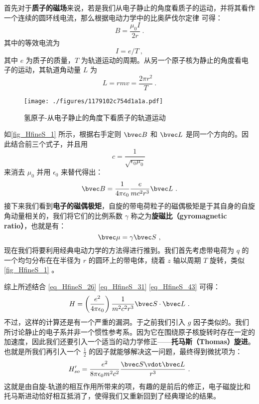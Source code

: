 首先对于\textbf{质子的磁场}来说，若是我们从电子静止的角度看质子的运动，并将其看作一个连续的圆环线电流，那么根据电动力学中的比奥萨伐尔定律 可得：
\begin{equation}
B=\frac{\mu_0I}{2r}~.
\end{equation}
其中的等效电流为
\begin{equation}
I=e/T~,
\end{equation}
其中 $e$ 为质子的质量，$T$ 为轨道运动的周期。从另一个原子核为静止的角度看电子的运动，其轨道角动量 $L$ 为
\begin{equation}
L=rmv=\frac{2\pi r^2}{T}~.
\end{equation}
\begin{figure}[ht]
\centering
\texttt{[image: ./figures/1179102c754d1a1a.pdf]}
\caption{氢原子-从电子静止的角度下看质子的轨道运动} \label{fig_HfineS_1}
\end{figure}
如\autoref{fig_HfineS_1} 所示，根据右手定则 $\bvec B$ 和 $\bvec L$ 是同一个方向的。因此结合前三个式子，并且用
\begin{equation}
c=\frac{1}{\sqrt{\epsilon_0\mu_0}}~
\end{equation}
来消去 $\mu_0$ 并用 $\epsilon_0$ 来替代得出：
\begin{equation}\label{eq_HfineS_31}
\bvec B = \frac{1}{4\pi\epsilon_0}\frac{e}{mc^2r^3}\bvec L~.
\end{equation}
接下来我们看到\textbf{电子的磁偶极矩}，自旋的带电荷粒子的磁偶极矩是于其自身的自旋角动量相关的，我们将它们的比例系数 $\gamma$ 称之为\textbf{旋磁比（gyromagnetic
ratio）}，也就是有：
\begin{equation}
\bvec\mu=\gamma\bvec S~,
\end{equation}
现在我们将要利用经典电动力学的方法得进行推到。我们首先考虑带电荷为 $q$ 的一个均匀分布在在半径为 $r$ 的圆环上的带电体，绕着 $z$ 轴以周期 $T$ 旋转，类似\autoref{fig_HfineS_1} 。


综上所述结合 \autoref{eq_HfineS_26} \autoref{eq_HfineS_31} \autoref{eq_HfineS_43} 可得：
\begin{equation}
H=\left(\frac{e^2}{4\pi\epsilon_0}\right)\frac{1}{m^2c^2r^3}\bvec S \cdot \bvec L~.
\end{equation}
不过，这样的计算还是有一个严重的漏洞。于之前我们引入 $g$ 因子类似的。我们所讨论静止的电子系并非一个惯性参考系。因为它在围绕原子核旋转时存在一定的加速度，因此我们还要引入一个适当的动力学修正——\textbf{托马斯（Thomas）旋进}。也就是所我们再引入一个 $\frac{1}{2}$ 的因子就能够解决这一问题，最终得到微扰项为：
\begin{equation}
H'_{so} = \frac{e^2}{8\pi \epsilon_0 m^2 c^2} \frac{\bvec S \vdot \bvec L}{r^3}~.
\end{equation}
这就是由自旋-轨道的相互作用所带来的项，有趣的是前后的修正，电子磁旋比和托马斯进动恰好相互抵消了，使得我们又重新回到了经典理论的结果。

